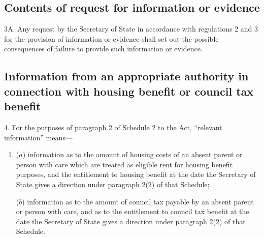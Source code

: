 \documentclass[a4paper,12pt]{article}
\begin{document}
\subsection[3A. Contents of request for information or evidence]{Contents of request for information or evidence}
%

3A.  Any request by the Secretary of State in accordance with regulations 2 and 3 for the provision of information or evidence shall set out the possible consequences of failure to provide such information or evidence.


\subsection[4. Information from an appropriate authority in connection with housing benefit or council tax benefit]{Information from an appropriate authority in connection with housing benefit or council tax benefit}

4.  For the purposes of paragraph 2 of Schedule 2 to the Act, “relevant information” means—
\begin{enumerate}\item[]
($a$) information as to the amount of housing costs of an absent parent or person with care which are treated as eligible rent for housing benefit purposes, and the entitlement to housing benefit at the date the Secretary of State gives a direction under paragraph 2(2) of that Schedule;

($b$) information as to the amount of council tax payable by an absent parent or person with care, and as to the entitlement to council tax benefit at the date the Secretary of State gives a direction under paragraph 2(2) of that Schedule.
\end{enumerate}
\end{document}
